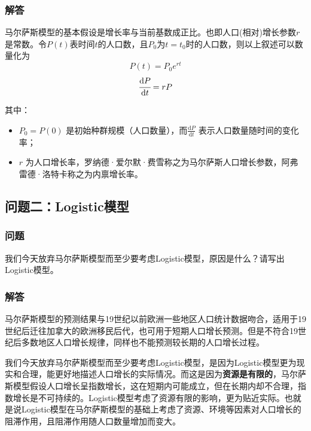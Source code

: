 \documentclass[a4,10pt,zihao=-4]{ctexart}
\begin{document}
\subsubsection{解答}

马尔萨斯模型的基本假设是增长率与当前基数成正比。也即人口(相对)增长参数$r$是常数。令$P(t)$表时间$t$的人口数，且$P_0$为$t=t_0$时的人口数，则以上叙述可以数量化为
\begin{equation*}
 P(t)=P_{0}e^{rt}
\end{equation*}
\begin{equation*}
 \cfrac{\text{d}P}{\text{d}t} = rP
\end{equation*}

其中：
\begin{itemize}
    \item $P_0 = P(0)$ 是初始种群规模（人口数量），而$\frac{\text{d}P}{\text{d}t}$ 表示人口数量随时间的变化率；
    \item $r$ 为人口增长率，罗纳德·爱尔默·费雪称之为马尔萨斯人口增长参数，阿弗雷德·洛特卡称之为内禀增长率。
\end{itemize}



\subsection{问题二：Logistic模型}

\subsubsection{问题}
我们今天放弃马尔萨斯模型而至少要考虑Logistic模型，原因是什么？请写出Logistic模型。
\subsubsection{解答}

马尔萨斯模型的预测结果与19世纪以前欧洲一些地区人口统计数据吻合，适用于19世纪后迁往加拿大的欧洲移民后代，也可用于短期人口增长预测。但是不符合19世纪后多数地区人口增长规律，同样也不能预测较长期的人口增长过程。

我们今天放弃马尔萨斯模型而至少要考虑Logistic模型，是因为Logistic模型更为现实和合理，能更好地描述人口增长的实际情况。而这是因为\textbf{资源是有限的}，马尔萨斯模型假设人口增长呈指数增长，这在短期内可能成立，但在长期内却不合理，指数增长是不可持续的。Logistic模型考虑了资源有限的影响，更为贴近实际。也就是说Logistic模型在马尔萨斯模型的基础上考虑了资源、环境等因素对人口增长的阻滞作用，且阻滞作用随人口数量增加而变大。
\end{document}
